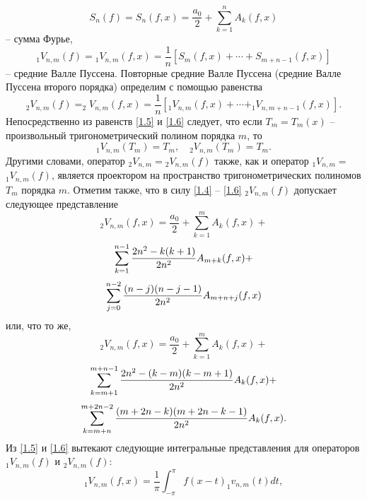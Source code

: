 \begin{equation} \label{1.4}
 S_n(f)=   S_n(f,x)=\frac{a_0}{2}+ \sum_{k=1}^n A_k(f,x)
\end{equation}
-- сумма Фурье,
\begin{equation}\label{1.5}
 {}_1 V_{n,m}(f)= {}_1 V_{n,m}(f,x)=\frac1{n}[S_m(f,x)+\cdots+S_{m+n-1}(f,x)]
\end{equation}
-- средние Валле Пуссена. Повторные средние Валле Пуссена (средние Валле Пуссена второго порядка) определим с помощью равенства
\begin{equation}\label{1.6}
 _2V_{n,m}(f)= _2V_{n,m}(f,x)=\frac1{n}[ _1V_{n,m}(f,x)+\cdots+ _1V_{n,m+n-1}(f,x)].
\end{equation}
Непосредственно из равенств \eqref{1.5} и \eqref{1.6} следует, что если $T_m=T_m(x)$ -- произвольный тригонометрический полином порядка $m$, то
\begin{equation}\label{1.7}
 _1V_{n,m}(T_m)=T_m, \quad _2V_{n,m}(T_m)=T_m.
\end{equation}
Другими словами, оператор $_2V_{n,m}=$$_2V_{n,m}(f)$ также, как и оператор $_1V_{n,m}=$ $_1V_{n,m}(f)$, является проектором на  пространство тригонометрических полиномов $T_m$ порядка $m$. Отметим также, что в силу \eqref{1.4} -- \eqref{1.6} $ _2V_{n,m}(f)$ допускает следующее представление
$$
 _2V_{n,m}(f,x)=\frac{a_0}{2}+ \sum_{k=1}^m A_k(f,x)+
$$
$$
 \sum_{k=1}^{n-1}{2n^2-k(k+1)\over2n^2}A_{m+k}(f,x)+
$$
$$
 \sum_{j=0}^{n-2}{(n-j)(n-j-1)\over2n^2}A_{m+n+j}(f,x)
$$
или, что то же,
$$
 _2V_{n,m}(f,x)=\frac{a_0}{2}+ \sum_{k=1}^m A_k(f,x)+
$$
$$
 \sum_{k=m+1}^{m+n-1}{2n^2-(k-m)(k-m+1)\over2n^2}A_{k}(f,x)+
$$
\begin{equation}\label{1.8}
 \sum_{k=m+n}^{m+2n-2}{(m+2n-k)(m+2n-k-1)\over2n^2}A_{k}(f,x).
\end{equation}
Из \eqref{1.5} и \eqref{1.6} вытекают следующие интегральные представления для операторов
$_1V_{n,m}(f)$ и $_2V_{n,m}(f)$:
\begin{equation}\label{1.9}
 _1V_{n,m}(f,x)=\frac{1}{\pi}\int_{-\pi}^\pi f(x-t)_1v_{n,m}(t)dt,
 \end{equation}


